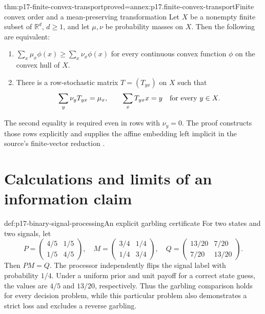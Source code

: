\begin{hbtheorem}{thm:p17-finite-convex-transport}{proved=annex:p17.finite-convex-transport}{Finite convex order and a mean-preserving transformation}
Let \(X\) be a nonempty finite subset of \(\mathbb R^d\), \(d\geq1\),
and let \(\mu,\nu\) be probability masses on \(X\). Then the following
are equivalent:
\begin{enumerate}
\item \(\sum_x\mu_x\phi(x)\geq\sum_x\nu_x\phi(x)\) for every continuous
      convex function \(\phi\) on the convex hull of \(X\).
\item There is a row-stochastic matrix \(T=(T_{yx})\) on \(X\) such that
      \[
       \sum_y\nu_yT_{yx}=\mu_x,\qquad
       \sum_xT_{yx}x=y\quad\hbox{for every }y\in X.
      \]
\end{enumerate}
The second equality is required even in rows with \(\nu_y=0\).
The proof constructs those rows explicitly and supplies the affine
embedding left implicit in the source's finite-vector reduction
\cite[theorem~7, pp.~267--268]{Blackwell1953EquivalentExperiments}.
\end{hbtheorem}

\section{Calculations and limits of an information claim}
\label{sec:p17-information-examples}

\begin{hbexample}{def:p17-binary-signal-processing}{An explicit garbling certificate}
For two states and two signals, let
\[
 P=\begin{pmatrix}4/5&1/5\\1/5&4/5\end{pmatrix},
 \quad
 M=\begin{pmatrix}3/4&1/4\\1/4&3/4\end{pmatrix},
 \quad
 Q=\begin{pmatrix}13/20&7/20\\7/20&13/20\end{pmatrix}.
\]
Then \(PM=Q\). The processor independently flips the signal label with
probability \(1/4\). Under a uniform prior and unit payoff for a correct
state guess, the values are \(4/5\) and \(13/20\), respectively.
Thus the garbling comparison holds for every decision problem, while this
particular problem also demonstrates a strict loss and excludes a reverse
garbling.
\end{hbexample}

